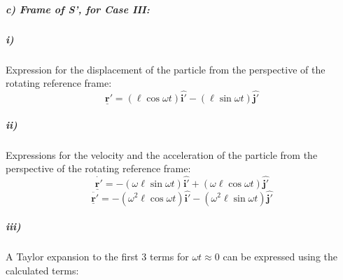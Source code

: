 \documentclass[a4paper,11pt]{scrartcl}
\begin{document}
\subparagraph{c) Frame of S', for Case III:}
\subparagraph{i)}
Expression for the displacement of the particle from the perspective of the rotating reference frame: 
\begin{equation}
 \underline{\mathbf{r}}'=(\ell{\cos{\omega}t})\hat{\mathbf{i'}}-(\ell{\sin{\omega}t})\hat{\mathbf{j'}}
\end{equation}
\subparagraph{ii)} 
Expressions for the velocity and the acceleration of the particle from the perspective of the rotating reference frame:
\begin{equation}
 \dot{\underline{\mathbf{r}}'}=-(\omega{\ell{\sin{\omega}t}})\hat{\mathbf{i'}}+(\omega{\ell{\cos{\omega}t}})\hat{\mathbf{j'}}
\end{equation}
\begin{equation}
 \ddot{\underline{\mathbf{r}}'}=-(\omega^2{\ell{\cos{\omega}t}})\hat{\mathbf{i'}}-(\omega^2{\ell{\sin{\omega}t}})\hat{\mathbf{j'}}
\end{equation}
\subparagraph{iii)}
A Taylor expansion to the first 3 terms for ${\omega}t\approx0$ can be expressed using the calculated terms:
\end{document}
